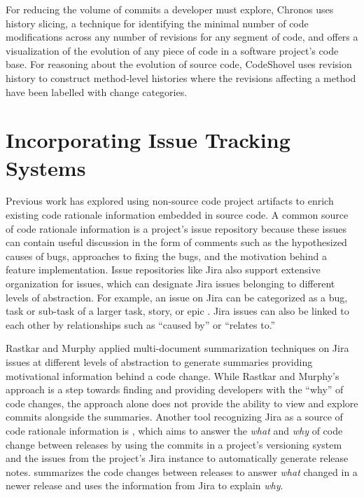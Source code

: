 For reducing the volume of commits a developer must explore, Chronos \cite{servant_history_2012} uses history slicing, a technique for identifying the minimal number of code modifications across any number of revisions for any segment of code, and offers a visualization of the evolution of any piece of code in a software project's code base.
For reasoning about the evolution of source code, CodeShovel \cite{grund_codeshovel_2021} uses revision history to construct method-level histories where the revisions affecting a method have been labelled with change categories.

\section{Incorporating Issue Tracking Systems}

Previous work has explored using non-source code project artifacts to enrich existing code rationale information embedded in source code. 
A common source of code rationale information is a project's issue repository because these issues can contain useful discussion in the form of comments such as the hypothesized causes of bugs, approaches to fixing the bugs, and the motivation behind a feature implementation. 
Issue repositories like Jira also support extensive organization for issues, which can designate Jira issues belonging to different levels of abstraction.
For example, an issue on Jira can be categorized as a bug, task or sub-task of a larger task, story, or epic \cite{jira-issue-types}.
Jira issues can also be linked to each other by relationships such as ``caused by'' or ``relates to.''

Rastkar and Murphy \cite{rastkar_why_2013} applied multi-document summarization techniques on Jira issues at different levels of abstraction to generate summaries providing motivational information behind a code change.
While Rastkar and Murphy's approach is a step towards finding and providing developers with the ``why'' of code changes, the approach alone does not provide the ability to view and explore commits alongside the summaries.
Another tool recognizing Jira as a source of code rationale information is  \cite{moreno_arena_2017}, which aims to answer the \emph{what} and \emph{why} of code change between releases by using the commits in a project's versioning system and the issues from the project's Jira instance to automatically generate release notes. 
 summarizes the code changes between releases to answer \emph{what} changed in a newer release and uses the information from Jira to explain \emph{why}.

